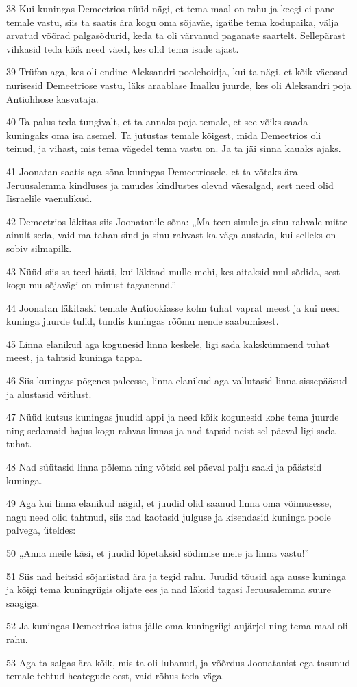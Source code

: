 \par 38 Kui kuningas Demeetrios nüüd nägi, et tema maal on rahu ja keegi ei pane temale vastu, siis ta saatis ära kogu oma sõjaväe, igaühe tema kodupaika, välja arvatud võõrad palgasõdurid, keda ta oli värvanud paganate saartelt. Sellepärast vihkasid teda kõik need väed, kes olid tema isade ajast.
\par 39 Trüfon aga, kes oli endine Aleksandri poolehoidja, kui ta nägi, et kõik väeosad nurisesid Demeetriose vastu, läks araablase Imalku juurde, kes oli Aleksandri poja Antiohhose kasvataja.
\par 40 Ta palus teda tungivalt, et ta annaks poja temale, et see võiks saada kuningaks oma isa asemel. Ta jutustas temale kõigest, mida Demeetrios oli teinud, ja vihast, mis tema vägedel tema vastu on. Ja ta jäi sinna kauaks ajaks.
\par 41 Joonatan saatis aga sõna kuningas Demeetriosele, et ta võtaks ära Jeruusalemma kindluses ja muudes kindlustes olevad väesalgad, sest need olid Iisraelile vaenulikud.
\par 42 Demeetrios läkitas siis Joonatanile sõna: „Ma teen sinule ja sinu rahvale mitte ainult seda, vaid ma tahan sind ja sinu rahvast ka väga austada, kui selleks on sobiv silmapilk.
\par 43 Nüüd siis sa teed hästi, kui läkitad mulle mehi, kes aitaksid mul sõdida, sest kogu mu sõjavägi on minust taganenud.”
\par 44 Joonatan läkitaski temale Antiookiasse kolm tuhat vaprat meest ja kui need kuninga juurde tulid, tundis kuningas rõõmu nende saabumisest.
\par 45 Linna elanikud aga kogunesid linna keskele, ligi sada kakskümmend tuhat meest, ja tahtsid kuninga tappa.
\par 46 Siis kuningas põgenes paleesse, linna elanikud aga vallutasid linna sissepääsud ja alustasid võitlust.
\par 47 Nüüd kutsus kuningas juudid appi ja need kõik kogunesid kohe tema juurde ning sedamaid hajus kogu rahvas linnas ja nad tapsid neist sel päeval ligi sada tuhat.
\par 48 Nad süütasid linna põlema ning võtsid sel päeval palju saaki ja päästsid kuninga.
\par 49 Aga kui linna elanikud nägid, et juudid olid saanud linna oma võimusesse, nagu need olid tahtnud, siis nad kaotasid julguse ja kisendasid kuninga poole palvega, üteldes:
\par 50 „Anna meile käsi, et juudid lõpetaksid sõdimise meie ja linna vastu!”
\par 51 Siis nad heitsid sõjariistad ära ja tegid rahu. Juudid tõusid aga ausse kuninga ja kõigi tema kuningriigis olijate ees ja nad läksid tagasi Jeruusalemma suure saagiga.
\par 52 Ja kuningas Demeetrios istus jälle oma kuningriigi aujärjel ning tema maal oli rahu.
\par 53 Aga ta salgas ära kõik, mis ta oli lubanud, ja võõrdus Joonatanist ega tasunud temale tehtud heategude eest, vaid rõhus teda väga. 

